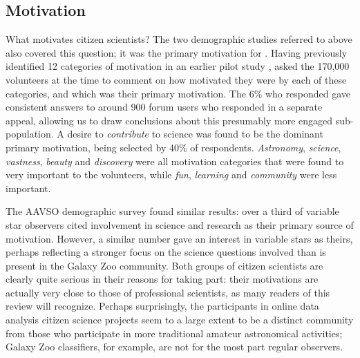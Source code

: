 \documentclass{ar2e}
\begin{document}

\subsection{Motivation}
\label{sec:crowd:motivation}


What motivates citizen scientists? The two demographic studies referred to
above also covered this question; it was the primary motivation for
\citeauthor{Rad++2013}. Having previously identified 12 categories of
motivation in an earlier pilot study \citep{Rad++2010}, \citeauthor{Rad++2013}
asked the 170,000 volunteers at the time to comment on how motivated they were
by each of these categories, and which was their primary motivation. The 6\%
who responded gave consistent answers to around 900 forum users who responded
in a separate appeal, allowing us to draw conclusions about this presumably
more engaged sub-population. A desire to {\it contribute} to science was found
to be the dominant primary motivation, being selected by 40\% of respondents.
{\it Astronomy}, {\it science}, {\it vastness}, {\it beauty} and 
{\it discovery} were all motivation categories that were found to very
important to the volunteers, while {\it fun}, {\it learning} and {\it
community} were less important. 

The AAVSO demographic survey \citep{P+P2012} found similar results: over a third
of variable star observers cited involvement in science and research as their
primary source of motivation. However, a similar number gave an interest in
variable stars as theirs, perhaps reflecting a stronger focus on the science
questions involved than is present in the Galaxy Zoo community. Both groups of
citizen scientists are clearly quite serious in their reasons for taking part:
their motivations are actually very close to those of professional scientists,
as many readers of this review will recognize. Perhaps surprisingly, the
participants in online data analysis citizen science projects seem to a large
extent to be a distinct community from those who participate in more traditional
amateur astronomical activities; Galaxy Zoo classifiers, for example, are not
for the most part regular observers. 


\end{document}
